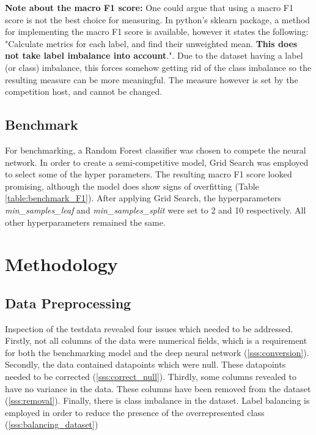 \documentclass[preprint,12pt]{elsarticle}
\begin{document}
\textbf{Note about the macro F1 score:} One could argue that using a macro F1 score is not the best choice for measuring. In python's sklearn package, a method for implementing the macro F1 score is available, however it states the following: "Calculate metrics for each label, and find their unweighted mean. \textbf{This does not take label imbalance into account}.". Due to the dataset having a label (or class) imbalance, this forces somehow getting rid of the class imbalance so the resulting measure can be more meaningful. The measure however is set by the competition host, and cannot be changed. 

\subsection{Benchmark}
\label{ss:benchmark}
For benchmarking, a Random Forest classifier was chosen to compete the neural network. In order to create a semi-competitive model, Grid Search was employed to select some of the hyper parameters. The resulting macro F1 score looked promising, although the model does show signs of overfitting (Table \ref{table:benchmark_F1}). After applying Grid Search, the hyperparameters \textit{min{\_}samples{\_}leaf} and \textit{min{\_}samples{\_}split} were set to 2 and 10 respectively. All other hyperparameters remained the same.

\begin{table}[]
\caption{macro F1 score for benchmarking model}
\label{table:benchmark_F1}
\end{table}


\section{Methodology}
\label{S:3}

\subsection{Data Preprocessing}

Inspection of the testdata revealed four issues which needed to be addressed. Firstly, not all columns of the data were numerical fields, which is a requirement for both the benchmarking model and the deep neural network (\ref{sss:conversion}). Secondly, the data contained datapoints which were null. These datapoints needed to be corrected (\ref{sss:correct_null}). Thirdly, some columns revealed to have no variance in the data. These columns have been removed from the dataset (\ref{sss:removal}). Finally, there is class imbalance in the dataset. Label balancing is employed in order to reduce the presence of the overrepresented class (\ref{sss:balancing_dataset})
\end{document}
